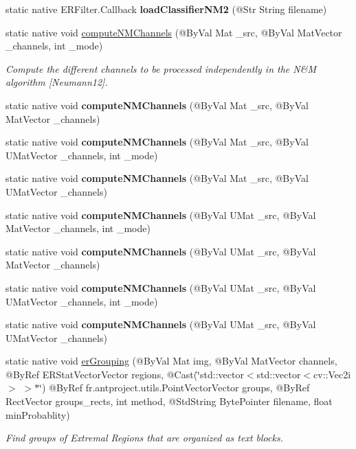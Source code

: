 \begin{DoxyCompactItemize}
static native E\+R\+Filter.\+Callback {\bfseries load\+Classifier\+N\+M2} (@Str String filename)
\item 
static native void \hyperlink{group__text__detect_ga67163615b824817020e39c2738a0b122}{compute\+N\+M\+Channels} (@By\+Val Mat \+\_\+src, @By\+Val Mat\+Vector \+\_\+channels, int \+\_\+mode)
\begin{DoxyCompactList}\small\item\em Compute the different channels to be processed independently in the N\&M algorithm \mbox{[}Neumann12\mbox{]}. \end{DoxyCompactList}\item 
static native void {\bfseries compute\+N\+M\+Channels} (@By\+Val Mat \+\_\+src, @By\+Val Mat\+Vector \+\_\+channels)
\item 
static native void {\bfseries compute\+N\+M\+Channels} (@By\+Val Mat \+\_\+src, @By\+Val U\+Mat\+Vector \+\_\+channels, int \+\_\+mode)
\item 
static native void {\bfseries compute\+N\+M\+Channels} (@By\+Val Mat \+\_\+src, @By\+Val U\+Mat\+Vector \+\_\+channels)
\item 
static native void {\bfseries compute\+N\+M\+Channels} (@By\+Val U\+Mat \+\_\+src, @By\+Val Mat\+Vector \+\_\+channels, int \+\_\+mode)
\item 
static native void {\bfseries compute\+N\+M\+Channels} (@By\+Val U\+Mat \+\_\+src, @By\+Val Mat\+Vector \+\_\+channels)
\item 
static native void {\bfseries compute\+N\+M\+Channels} (@By\+Val U\+Mat \+\_\+src, @By\+Val U\+Mat\+Vector \+\_\+channels, int \+\_\+mode)
\item 
static native void {\bfseries compute\+N\+M\+Channels} (@By\+Val U\+Mat \+\_\+src, @By\+Val U\+Mat\+Vector \+\_\+channels)
\item 
static native void \hyperlink{group__text__detect_ga3198c558c08dac61bce863d430bf2da6}{er\+Grouping} (@By\+Val Mat img, @By\+Val Mat\+Vector channels, @By\+Ref E\+R\+Stat\+Vector\+Vector regions, @Cast(\char`\"{}std\+::vector$<$std\+::vector$<$cv\+::\+Vec2i$>$ $>$$\ast$\char`\"{}) @By\+Ref fr.antproject.utils.Point\+Vector\+Vector groups, @By\+Ref Rect\+Vector groups\+\_\+rects, int method, @Std\+String Byte\+Pointer filename, float min\+Probablity)
\begin{DoxyCompactList}\small\item\em Find groups of Extremal Regions that are organized as text blocks. \end{DoxyCompactList}\item 
$$
\end{DoxyCompactItemize}
